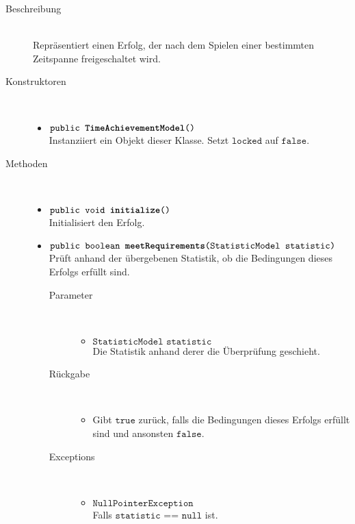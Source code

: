 \begin{description}
\item[Beschreibung] \hfill \\ Repräsentiert einen Erfolg, der nach dem Spielen einer bestimmten Zeitspanne freigeschaltet wird.
	
\item[Konstruktoren] \hfill \\
	\vspace{-.8cm}
	\begin{itemize}
		\item $\texttt{public \textbf{TimeAchievementModel}()}$ \\ Instanziiert ein Objekt dieser Klasse. Setzt $\texttt{locked}$ auf $\texttt{false}$.
	\end{itemize}
	
\item[Methoden] \hfill \\
	\vspace{-.8cm}
	\begin{itemize}
		\item $\texttt{public void \textbf{initialize}()}$ \\ Initialisiert den Erfolg.
		
		\item $\texttt{public boolean \textbf{meetRequirements}(StatisticModel statistic)}$ \\ Prüft anhand der übergebenen Statistik, ob die Bedingungen dieses Erfolgs erfüllt sind.
		\begin{description}
		\item[Parameter] \hfill \\
			\vspace{-.8cm}
			\begin{itemize}
				\item $\texttt{StatisticModel statistic}$ \\ Die Statistik anhand derer die Überprüfung geschieht. 
			\end{itemize}
			\item[Rückgabe] \hfill \\
			\vspace{-.8cm}
			\begin{itemize}
				\item Gibt $\texttt{true}$ zurück, falls die Bedingungen dieses Erfolgs erfüllt sind und ansonsten $\texttt{false}$.
			\end{itemize}
			\item[Exceptions] \hfill \\
			\vspace{-.8cm}
			\begin{itemize}
				\item $\texttt{NullPointerException}$ \\ Falls $\texttt{statistic == null}$ ist.
			\end{itemize}
		\end{description}
	\end{itemize}
\end{description}

